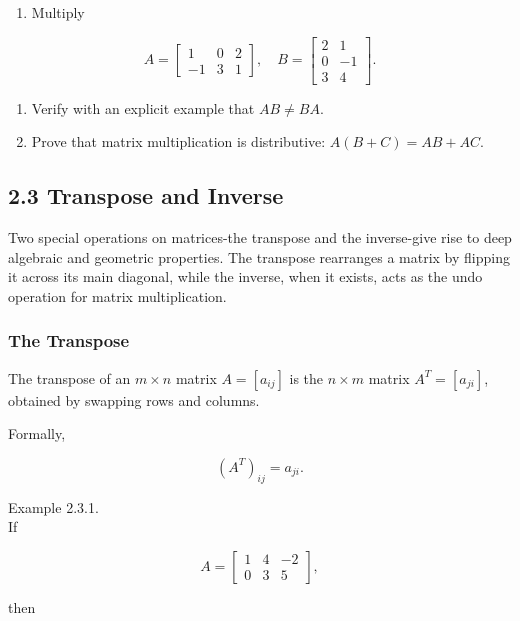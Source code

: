 \documentclass[
  12pt,
  a4paper,
]{article}
\begin{document}
\begin{enumerate}
\def\labelenumi{\arabic{enumi}.}
\item
  Multiply
\end{enumerate}

\[A = \begin{bmatrix} 1 & 0 & 2 \\ -1 & 3 & 1 \end{bmatrix}, \quad
B = \begin{bmatrix} 2 & 1 \\ 0 & -1 \\ 3 & 4 \end{bmatrix}.\]

\begin{enumerate}
\def\labelenumi{\arabic{enumi}.}
\item
  Verify with an explicit example that \(AB \neq BA\).
\item
  Prove that matrix multiplication is distributive:
  \(A(B+C) = AB + AC\).
\end{enumerate}

\subsection{2.3 Transpose and Inverse}\label{23-transpose-and-inverse}

Two special operations on matrices-the transpose and the inverse-give
rise to deep algebraic and geometric properties. The transpose
rearranges a matrix by flipping it across its main diagonal, while the
inverse, when it exists, acts as the undo operation for matrix
multiplication.

\subsubsection{The Transpose}\label{the-transpose}

The transpose of an \(m \times n\) matrix \(A = [a_{ij}]\) is the
\(n \times m\) matrix \(A^T = [a_{ji}]\), obtained by swapping rows and
columns.

Formally,

\[(A^T)_{ij} = a_{ji}.\]

Example 2.3.1.\\
If

\[A = \begin{bmatrix}
1 & 4 & -2 \\
0 & 3 & 5
\end{bmatrix},\]

then
\end{document}
